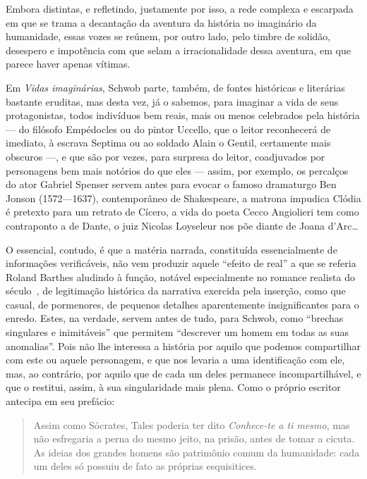 Embora distintas, e refletindo, justamente por isso, a rede complexa e escarpada
em que se trama a decantação da aventura da história no imaginário da
humanidade, essas vozes se reúnem, por outro lado, pelo timbre de solidão,
desespero e impotência com que selam a irracionalidade dessa aventura, em que
parece haver apenas vítimas.

Em \textit{Vidas imaginárias}, Schwob parte, também, de fontes históricas e
literárias bastante eruditas, mas desta vez, já o sabemos, para imaginar a vida
de seus protagonistas, todos indivíduos bem reais, mais ou menos celebrados
pela história --- do filósofo Empédocles ou do pintor Uccello, que o leitor
reconhecerá de imediato, à escrava Septima ou ao soldado Alain o Gentil,
certamente mais obscuros ---, e que são por vezes, para surpresa do leitor,
coadjuvados por  personagens bem mais notórios do que eles --- assim, por
exemplo, os percalços do ator Gabriel Spenser servem antes para evocar o famoso
dramaturgo Ben Jonson (1572---1637), contemporâneo de Shakespeare, a matrona impudica Clódia
é pretexto para um retrato de Cícero, a vida do poeta Cecco Angiolieri tem como
contraponto a de Dante, o juiz Nicolas Loyseleur nos põe diante de Joana d’Arc\ldots{} 

O essencial, contudo, é que a matéria narrada, constituída essencialmente de
informações verificáveis, não vem produzir aquele “efeito de real” a que se
referia Roland Barthes aludindo à função, notável especialmente no romance
realista do século~, de legitimação histórica da narrativa exercida pela
inserção, como que casual, de pormenores, de pequenos detalhes aparentemente
insignificantes para o enredo. Estes, na verdade, servem antes de tudo, para
Schwob, como “brechas singulares e inimitáveis” que permitem “descrever um
homem em todas as suas anomalias”. Pois não lhe interessa a história por
aquilo que podemos compartilhar com este ou aquele personagem, e que nos
levaria a uma identificação com ele, mas, ao contrário, por aquilo que de cada
um deles permanece incompartilhável, e que o restitui, assim, à sua
singularidade mais plena. Como o próprio escritor antecipa em seu prefácio:

\begin{quote}
Assim como Sócrates, Tales poderia ter dito \textit{Conhece-te a ti mesmo}, mas não esfregaria a perna do mesmo jeito, na prisão, antes de tomar a cicuta.
As ideias dos grandes homens são patrimônio comum da humanidade: cada um deles
só possuiu de fato as próprias esquisitices.
\end{quote}

